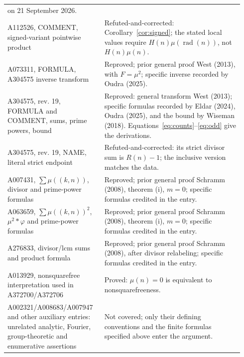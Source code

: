 \documentclass[11pt]{article}
\newcommand{\mob}{\mu}
\newcommand{\rad}{\operatorname{rad}}
\begin{document}
\begin{longtable}{@{}p{0.37\linewidth}p{0.57\linewidth}@{}}
on 21 September 2026.\\
A112526, COMMENT, signed-variant pointwise product &
Refuted-and-corrected: Corollary~\ref{cor:signed}; the stated local
values require $H(n)\mob(\rad(n))$, not $H(n)\mob(n)$.\\
A073311, FORMULA, A304575 inverse transform &
Reproved; prior general proof West (2013), with $F=\mob^2$;
specific inverse recorded by Oudra (2025).\\
A304575, rev. 19, FORMULA and COMMENT, sums, prime powers, bound &
Reproved: general transform West (2013); specific formulas recorded
by Eldar (2024), Oudra (2025), and the bound by Wiseman (2018).
Equations~\eqref{eq:counts}--\eqref{eq:odd} give the derivations.\\
A304575, rev. 19, NAME, literal strict endpoint &
Refuted-and-corrected: its strict divisor sum is $R(n)-1$;
the inclusive version matches the data.\\
A007431, $\sum\mob((k,n))$, divisor and prime-power formulas &
Reproved; prior general proof Schramm (2008), theorem (i), $m=0$;
specific formulas credited in the entry.\\
A063659, $\sum\mob((k,n))^2$, $\mob^2*\varphi$ and prime-power formulas &
Reproved; prior general proof Schramm (2008), theorem (i), $m=0$;
specific formulas credited in the entry.\\
A276833, divisor/lcm sums and product formula &
Reproved; prior general proof Schramm (2008), after divisor relabeling;
specific formulas credited in the entry.\\
A013929, nonsquarefree interpretation used in A372700/A372706 &
Proved: $\mob(n)=0$ is equivalent to nonsquarefreeness.\\
A002321/A008683/A007947 and other auxiliary entries: unrelated
analytic, Fourier, group-theoretic and enumerative assertions &
Not covered; only their defining conventions and the finite formulas
specified above enter the argument.\\
\end{longtable}
\normalsize
\end{document}
